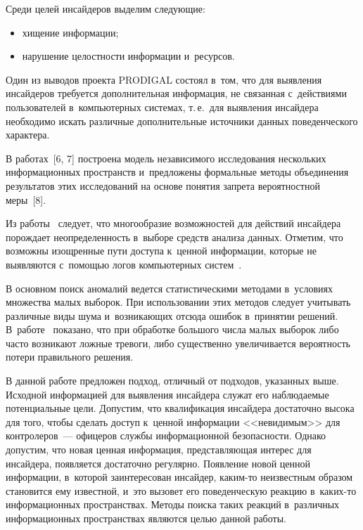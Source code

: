 \begin{multicols}{2}
  Среди целей инсайдеров выделим следующие:
  \begin{itemize}
\item хищение информации;
\item нарушение целостности информации и~ресурсов.
\end{itemize}

  Один из выводов проекта PRODIGAL состоял в~том, что для выявления 
инсайдеров требуется дополнительная информация, не связанная с~действиями 
пользователей в~компьютерных системах, т.\,е.\ для выявления инсайдера 
необходимо искать различные дополнительные источники данных поведенческого 
характера. 
  
  В работах~[6, 7] построена модель независимого исследования нескольких 
информационных пространств и~предложены формальные методы объединения 
результатов этих исследований на основе понятия запрета вероятностной 
меры~[8]. 
  
  Из работы~\cite{5-gr} следует, что многообразие возможностей для действий 
инсайдера порождает неопределенность в~выборе средств анализа данных. 
Отметим, что возможны изощренные пути доступа к~ценной информации, 
которые не выявляются с~помощью логов компьютерных систем~\cite{3-gr}. 
  
  В основном поиск аномалий ведется статистическими методами в~условиях 
множества малых выборок. При использовании этих методов следует учитывать 
различные виды шума и~возникающих отсюда ошибок в~принятии решений. 
В~работе~\cite{9-gr} показано, что при обработке большого числа малых выборок 
либо часто возникают ложные тревоги, либо существенно увеличивается 
вероятность потери правильного решения. 
  
  В данной работе предложен подход, отличный от подходов, указанных выше. 
Исходной информацией для выявления инсайдера служат его наблюдаемые 
потенциальные цели. Допустим, что квалификация инсайдера достаточно высока 
для того, чтобы сделать доступ к~ценной информации <<невидимым>> для 
контролеров~--- офицеров службы информационной безопасности. Однако 
допустим, что новая ценная информация, представляющая интерес для инсайдера, 
появляется достаточно регулярно. Появление новой ценной информации, 
в~которой заинтересован инсайдер, каким-то неизвестным образом становится 
ему известной, и~это вызовет его поведенческую реакцию в~ка\-ких-то 
информационных пространствах. Методы поиска таких реакций в~различных 
информационных пространствах являются целью данной работы.
{ %

}
  

\end{multicols}
